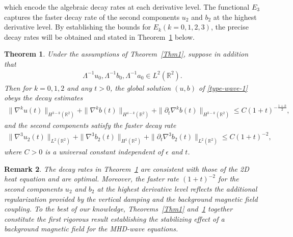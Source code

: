 \documentclass[reqno,11pt]{amsart}
\newtheorem{Thm}{Theorem}
\newtheorem{Rem}[Thm]{Remark}
\def\R{\mathbb R}
\numberwithin{Thm}{section}
\begin{document}
which encode the algebraic decay rates at each derivative level. The functional $E_3$
captures the faster decay rate of the second components $u_2$ and $b_2$ at the highest
derivative level. By establishing the bounds for $E_k(k=0,1,2,3)$, the precise decay rates will be obtained and stated  in Theorem~\ref{Thm2} below.
\begin{Thm}\label{Thm2}
	Under the assumptions of Theorem~\ref{Thm1}, suppose in addition that
	\begin{align*}
		\Lambda^{-1} u_0,\Lambda^{-1} b_0,\Lambda^{-1}a_0
\in L^2(\R^2).
	\end{align*}
	Then for $k=0,1,2$ and any $t>0$, the global solution $(u,b)$ of \eqref{type-wave-1}
	obeys the decay estimates
	\begin{align*}
		\|\nabla^{k} u(t)\|_{H^{3-k}(\mathbb{R}^2)}+\|\nabla^{k} b(t)\|_{H^{4-k}(\mathbb{R}^2)}
		+\|\partial_t \nabla^{k} b(t)\|_{H^{3-k}(\mathbb{R}^2)}
		\leq C(1+t)^{-\frac{1+k}{2}},
	\end{align*}
	and the second components satisfy the faster decay rate
	\begin{align*}
		\|\nabla^3 u_2(t)\|_{L^2(\mathbb{R}^2)}+\|\nabla^3 b_2(t)\|_{H^1(\mathbb{R}^2)}
		+\|\partial_t \nabla^3 b_2(t)\|_{L^2(\mathbb{R}^2)}\leq C(1+t)^{-2},
	\end{align*}
	where $C>0$ is a universal constant independent of $\epsilon$ and $t$.
\end{Thm}

\begin{Rem}
	The decay rates in Theorem~\ref{Thm2} are consistent with those of the 2D heat equation
	and are optimal. Moreover, the faster rate $(1+t)^{-2}$ for the second components
	$u_2$ and $b_2$ at the highest derivative level reflects the additional regularization
	provided by the vertical damping and the background magnetic field coupling. To the best
	of our knowledge, Theorems~\ref{Thm1} and~\ref{Thm2} together constitute the first
	rigorous result establishing the stabilizing effect of a background magnetic field for
	the MHD-wave equations.
\end{Rem}
\end{document}
